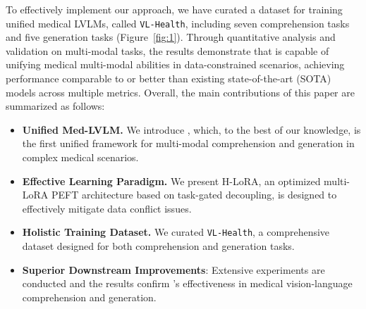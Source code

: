 To effectively implement our approach, we have curated a dataset for training unified medical LVLMs, called \texttt{VL-Health}, including seven comprehension tasks and five generation tasks (Figure~\ref{fig:1}).
%
Through quantitative analysis and validation on multi-modal tasks, the results demonstrate that \ourmethod{} is capable of unifying medical multi-modal abilities in data-constrained scenarios, achieving performance comparable to or better than existing state-of-the-art (SOTA) models across multiple metrics. Overall, the main contributions of this paper are summarized as follows:
\begin{itemize}
    \item \textbf{Unified Med-LVLM.} We introduce \ourmethod{}, which, to the best of our knowledge, is the first unified framework for multi-modal comprehension and generation in complex medical scenarios.
    \item \textbf{Effective Learning Paradigm.} We present H-LoRA, an optimized multi-LoRA PEFT 
    architecture based on task-gated decoupling, is designed to effectively mitigate data conflict issues.
    \item \textbf{Holistic Training Dataset.} We curated \texttt{VL-Health}, a comprehensive dataset designed for both comprehension and generation tasks.
    \item  \textbf{Superior Downstream Improvements}: Extensive experiments are conducted and the results confirm
 \ourmethod{}'s effectiveness
in medical vision-language comprehension and generation.
\end{itemize}